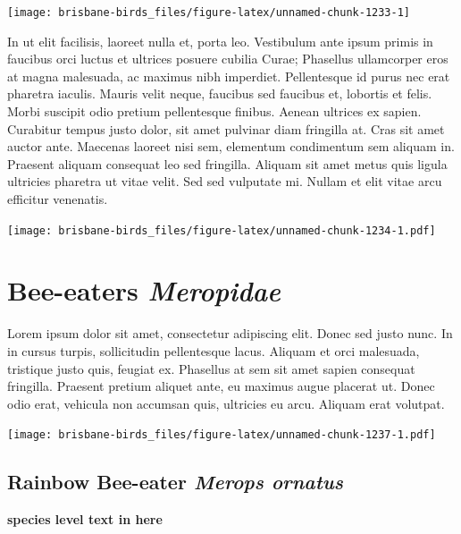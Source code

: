 \documentclass[]{book}
\let\origfigure\figure
\let\endorigfigure\endfigure
\renewenvironment{figure}[1][2] {
  \expandafter\origfigure\expandafter[H]
} {
  \endorigfigure
}
\begin{document}
\begin{figure}
\texttt{[image: brisbane-birds\_files/figure-latex/unnamed-chunk-1233-1]} \caption{insert figure caption}\label{fig:unnamed-chunk-1233}
\end{figure}

In ut elit facilisis, laoreet nulla et, porta leo. Vestibulum ante ipsum
primis in faucibus orci luctus et ultrices posuere cubilia Curae;
Phasellus ullamcorper eros at magna malesuada, ac maximus nibh
imperdiet. Pellentesque id purus nec erat pharetra iaculis. Mauris velit
neque, faucibus sed faucibus et, lobortis et felis. Morbi suscipit odio
pretium pellentesque finibus. Aenean ultrices ex sapien. Curabitur
tempus justo dolor, sit amet pulvinar diam fringilla at. Cras sit amet
auctor ante. Maecenas laoreet nisi sem, elementum condimentum sem
aliquam in. Praesent aliquam consequat leo sed fringilla. Aliquam sit
amet metus quis ligula ultricies pharetra ut vitae velit. Sed sed
vulputate mi. Nullam et elit vitae arcu efficitur venenatis.

\begin{figure}
\centering
\texttt{[image: brisbane-birds\_files/figure-latex/unnamed-chunk-1234-1.pdf]}
\caption{\label{fig:unnamed-chunk-1234}insert figure caption}
\end{figure}

\chapter{\texorpdfstring{Bee-eaters
\emph{Meropidae}}{Bee-eaters Meropidae}}\label{bee-eaters-meropidae}

Lorem ipsum dolor sit amet, consectetur adipiscing elit. Donec sed justo
nunc. In in cursus turpis, sollicitudin pellentesque lacus. Aliquam et
orci malesuada, tristique justo quis, feugiat ex. Phasellus at sem sit
amet sapien consequat fringilla. Praesent pretium aliquet ante, eu
maximus augue placerat ut. Donec odio erat, vehicula non accumsan quis,
ultricies eu arcu. Aliquam erat volutpat.

\texttt{[image: brisbane-birds\_files/figure-latex/unnamed-chunk-1237-1.pdf]}

\section{\texorpdfstring{Rainbow Bee-eater \emph{Merops
ornatus}}{Rainbow Bee-eater Merops ornatus}}\label{rainbow-bee-eater-merops-ornatus}

\textbf{species level text in here}
\end{document}
